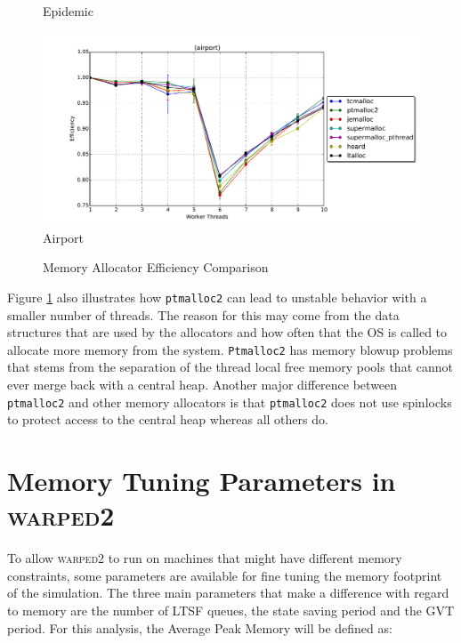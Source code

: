 \documentclass[11pt]{book}
\begin{document}
\begin{figure}
\begin{minipage}{.5\textwidth}
\begin{center}
      Epidemic \\
    \end{center}
  \end{minipage}%
  \begin{minipage}{.5\textwidth}
    \begin{center}
      \includegraphics[width=\textwidth,keepaspectratio,quiet]{figs/memory_allocation/airport_efficiency.pdf} \\
      Airport \\
    \end{center}
  \end{minipage}
  \caption{Memory Allocator Efficiency Comparison}\label{allocator_analysis_efficiency}
\end{figure}

Figure \ref{allocator_analysis_efficiency} also illustrates how \texttt{ptmalloc2} can lead to
unstable behavior with a smaller number of threads.  The reason for this may come from the data
structures that are used by the allocators and how often that the OS is called to allocate more
memory from the system.  \texttt{Ptmalloc2} has memory blowup problems that stems from the
separation of the thread local free memory pools that cannot ever merge back with a central heap.
Another major difference between \texttt{ptmalloc2} and other memory allocators is that
\texttt{ptmalloc2} does not use spinlocks to protect access to the central heap whereas all others
do.

\section{Memory Tuning Parameters in \textsc{warped2}}

To allow \textsc{warped2} to run on machines that might have different memory constraints, some
parameters are available for fine tuning the memory footprint of the simulation.  The three main
parameters that make a difference with regard to memory are the number of LTSF queues, the state
saving period and the GVT period.  For this analysis, the Average Peak Memory will be defined as:
\end{document}

